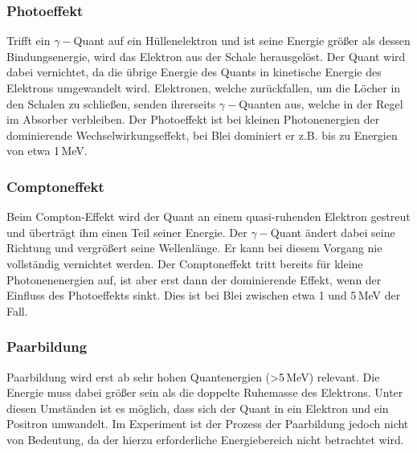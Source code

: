             \subsubsection{Photoeffekt}

                Trifft ein $\gamma-$Quant auf ein Hüllenelektron und ist seine 
                Energie größer als dessen Bindungsenergie, wird das Elektron 
                aus der Schale herausgelöst. Der Quant wird dabei vernichtet, 
                da die übrige Energie des Quants in kinetische Energie des Elektrons
                umgewandelt wird. Elektronen, welche zurückfallen, um die Löcher 
                in den Schalen zu schließen, senden ihrerseits $\gamma-$Quanten aus,
                welche in der Regel im Absorber verbleiben. Der Photoeffekt ist 
                bei kleinen Photonenergien der dominierende Wechselwirkungseffekt, 
                bei Blei dominiert er z.B. bis zu Energien von etwa 1\,MeV.


            \subsubsection{Comptoneffekt}

                Beim Compton-Effekt wird der Quant an einem quasi-ruhenden Elektron gestreut
                und überträgt ihm einen Teil seiner Energie. Der $\gamma-$Quant ändert dabei 
                seine Richtung und vergrößert seine Wellenlänge. Er kann bei diesem Vorgang nie 
                vollständig vernichtet werden. Der Comptoneffekt tritt bereits für kleine Photonenenergien
                auf, ist aber erst dann der dominierende Effekt, wenn der Einfluss des Photoeffekts sinkt. 
                Dies ist bei Blei zwischen etwa 1 und 5\,MeV der Fall.

            \subsubsection{Paarbildung}

                Paarbildung wird erst ab sehr hohen Quantenergien (>5\,MeV) relevant.
                Die Energie muss dabei größer sein als die doppelte Ruhemasse 
                des Elektrons. Unter diesen Umständen ist es möglich, dass sich der 
                Quant in ein Elektron und ein Positron umwandelt. Im Experiment ist 
                der Prozess der Paarbildung jedoch nicht von Bedeutung, da der hierzu 
                erforderliche Energiebereich nicht betrachtet wird.

